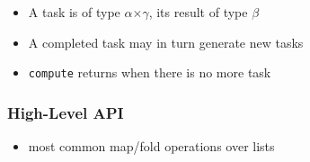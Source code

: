 \documentclass[xcolor=dvipsnames]{beamer}
\begin{document}
\begin{frame}
\medskip\noindent
  \begin{itemize}
  \item A task is of type \textsf{\ensuremath{\alpha}\hspace*{1.22ex}\ensuremath{\times}\hspace*{1.22ex}\ensuremath{\gamma}}, its result of type
    \textsf{\ensuremath{\beta}}
  \item A completed task may in turn generate new tasks
  \item \texttt{compute} returns when there is no more task
  \end{itemize}
\end{frame}


\begin{frame}\frametitle {High-Level API}
  \begin{itemize}
  \item most common map/fold operations over lists
  \end{itemize}
  

\medskip\noindent
{\colorbox{tmpcolor}{\begin{minipage}{\textwidth}\ttfamily\parindent 0pt


\end{minipage}}}
\end{frame}
\end{document}
